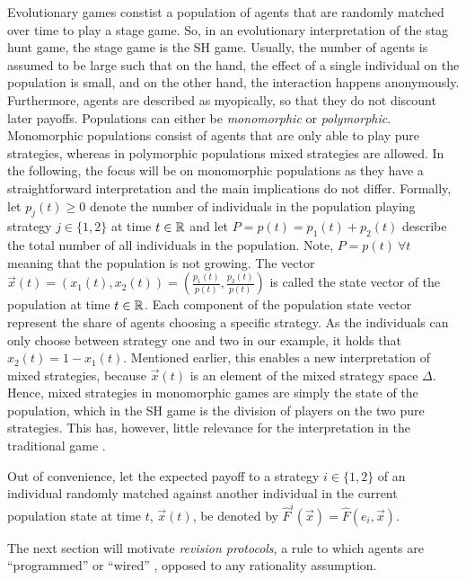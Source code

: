 \label{sec:evolutionarystaghunt}
Evolutionary games constist a population of agents that are randomly matched 
over time to play a stage game. So, in an evolutionary interpretation of the 
stag hunt game, the stage game is the SH game. 
Usually, the number of agents is assumed to be large such that on the hand, 
the effect of a single individual on the population is small, and on the
other hand, the interaction happens anonymously.
Furthermore, agents are described as myopically, so that they do not 
discount later payoffs.
Populations can either be \textit{monomorphic} or \textit{polymorphic}.
Monomorphic populations consist of agents that are only able to play pure
strategies, whereas in polymorphic populations mixed strategies are allowed.
In the following, the focus will be on monomorphic populations as they have
a straightforward interpretation and the main implications do not differ. 
Formally, let $p_j(t) \geq 0$ denote the number of individuals in 
the population playing strategy $j \in \{1,2\}$ at time $t \in \mathbb{R}$ and 
let $P = p(t) = p_1(t) + p_2(t)$ describe the total number of all individuals 
in the population. Note, $P =p(t)\ \forall t$ meaning that the population 
is not growing. The vector $\vec{x}(t) = \left(x_1(t),x_2(t)\right)
=\left(\frac{p_1(t)}{p(t)},\frac{p_2(t)}{p(t)}\right)$ is called the state 
vector of the population at time $t \in \mathbb{R}$. 
Each component of the population state vector represent the share of agents 
choosing a specific strategy. As the individuals can only choose between 
strategy one and two in our example, it holds that  $x_2(t) = 1-x_1(t)$. 
Mentioned earlier, this enables a new interpretation of mixed strategies,
because $\vec{x}(t)$ is an element of the mixed strategy space $\Delta$.
Hence, mixed strategies in monomorphic games are simply the state
of the population, which in the SH game is the division of players on the two
pure strategies. This has, however, little relevance for the interpretation
in the traditional game \parencite[914-915]{rubinstein_comments_1991}.

Out of convenience, let the expected payoff 
to a strategy $i \in \{1,2\}$ of an individual randomly matched
against another individual in the current population state at time $t$, 
$\vec{x}(t)$, be denoted by $\hat{F}^i(\vec{x}) = \hat{F}(e_i,\vec{x})$. 

The next section will motivate \textit{revision protocols}, a rule to
which agents are ``programmed'' or ``wired'' \parencite{gintis_game_2000}, 
opposed to any rationality assumption. 
